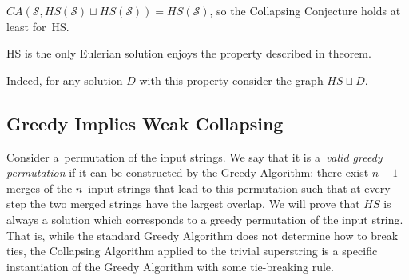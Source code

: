 \begin{corollary}
    $CA(\mathcal{S}, HS(\mathcal{S})\sqcup HS(\mathcal{S})) = HS(\mathcal{S})$, so the Collapsing Conjecture holds at least for~HS.
\end{corollary}
\begin{corollary}
    HS is the only Eulerian solution enjoys the property described in theorem.
\end{corollary}
Indeed, for any solution $D$ with this property consider the graph $HS \sqcup D$.

\subsection{Greedy Implies Weak Collapsing}
\label{sec:gr_im_wcc}
Consider a~permutation of the input strings. We say that it is a~{\em valid greedy permutation} if it can be constructed by the Greedy Algorithm: there exist $n-1$ merges of the $n$~input strings that lead to this permutation such that at every step the two merged strings have the largest overlap. We will prove that $HS$ is always a solution which corresponds to a greedy permutation of the input string. That is, while the standard Greedy Algorithm does not determine how to break ties, the Collapsing Algorithm applied to the trivial superstring is a specific instantiation of the Greedy Algorithm with some tie-breaking rule.

